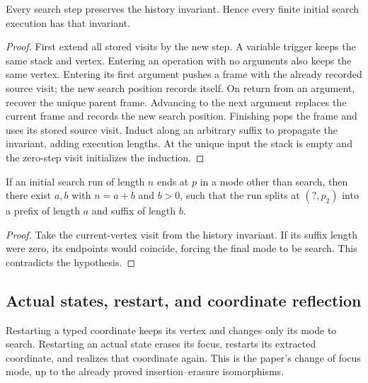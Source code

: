 \begin{lemma}
Every search step preserves the history invariant. Hence every finite initial
search execution has that invariant.
\end{lemma}
\begin{proof}
First extend all stored visits by the new step. A variable trigger keeps the
same stack and vertex. Entering an operation with no arguments also keeps the
same vertex. Entering its first argument pushes a frame with the already
recorded source visit; the new search position records itself. On return from
an argument, recover the unique parent frame. Advancing to the next argument
replaces the current frame and records the new search position. Finishing
pops the frame and uses its stored source visit. Induct along an arbitrary
suffix to propagate the invariant, adding execution lengths. At the unique
input the stack is empty and the zero-step visit initializes the induction.
\end{proof}


\begin{theorem}
If an initial search run of length $n$ ends at $p$ in a mode other than search,
then there exist $a,b$ with $n=a+b$ and $b>0$, such that the run splits at
$(?,p_2)$ into a prefix of length $a$ and suffix of length $b$.
\end{theorem}
\begin{proof}
Take the current-vertex visit from the history invariant. If its suffix length
were zero, its endpoints would coincide, forcing the final mode to be search.
This contradicts the hypothesis.
\end{proof}


\subsection{Actual states, restart, and coordinate reflection}

\begin{definition}
Restarting a typed coordinate keeps its vertex and changes only its mode to
search. Restarting an actual state erases its focus, restarts its extracted
coordinate, and realizes that coordinate again. This is the paper's change
of focus mode, up to the already proved insertion--erasure isomorphisms.
\end{definition}


